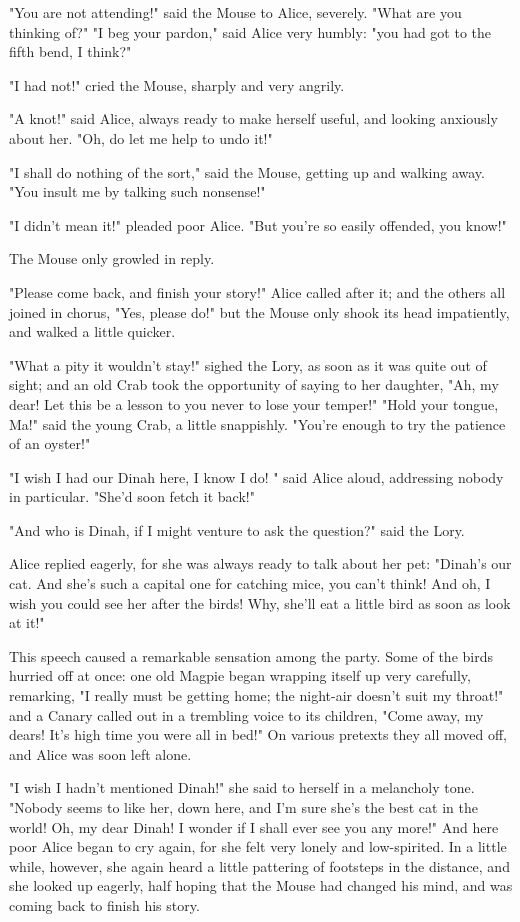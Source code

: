 ​"You are not attending!" said the Mouse to Alice, severely. "What are you thinking of?"
"I beg your pardon," said Alice very humbly: "you had got to the fifth bend, I think?"

"I had not!" cried the Mouse, sharply and very angrily.

"A knot!" said Alice, always ready to make herself useful, and looking anxiously about her. "Oh, do let me help to undo it!"

"I shall do nothing of the sort," said the Mouse, getting up and walking away. "You insult me by talking such nonsense!"

"I didn't mean it!" pleaded poor Alice. "But you're so easily offended, you know!"

The Mouse only growled in reply.

"Please come back, and finish your story!" Alice called after it; and the others all joined in chorus, "Yes, please do!" but the Mouse only shook its head impatiently, and walked a little quicker.

"What a pity it wouldn't stay!" sighed the Lory, as soon as it was quite out of sight; ​and an old Crab took the opportunity of saying to her daughter, "Ah, my dear! Let this be a lesson to you never to lose your temper!" "Hold your tongue, Ma!" said the young Crab, a little snappishly. "You're enough to try the patience of an oyster!"

"I wish I had our Dinah here, I know I do! " said Alice aloud, addressing nobody in particular. "She'd soon fetch it back!"

"And who is Dinah, if I might venture to ask the question?" said the Lory.

Alice replied eagerly, for she was always ready to talk about her pet: "Dinah's our cat. And she's such a capital one for catching mice, you can't think! And oh, I wish you could see her after the birds! Why, she'll eat a little bird as soon as look at it!"

This speech caused a remarkable sensation among the party. Some of the birds hurried off at once: one old Magpie began wrapping itself up very carefully, remarking, "I really must be getting home; the night-air doesn't ​suit my throat!" and a Canary called out in a trembling voice to its children, "Come away, my dears! It's high time you were all in bed!" On various pretexts they all moved off, and Alice was soon left alone.

"I wish I hadn't mentioned Dinah!" she said to herself in a melancholy tone. "Nobody seems to like her, down here, and I'm sure she's the best cat in the world! Oh, my dear Dinah! I wonder if I shall ever see you any more!" And here poor Alice began to cry again, for she felt very lonely and low-spirited. In a little while, however, she again heard a little pattering of footsteps in the distance, and she looked up eagerly, half hoping that the Mouse had changed his mind, and was coming back to finish his story.


